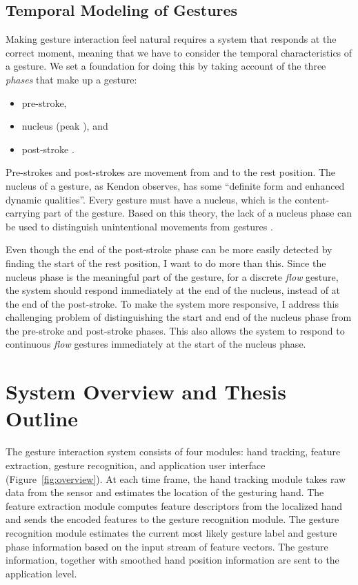 \subsection{Temporal Modeling of Gestures}\label{sec:temporal-model}
Making gesture interaction feel natural requires a system that responds at the
correct moment, meaning that we have to consider the temporal
characteristics of a gesture. We set a foundation for doing this by taking
account of the three \textit{phases} that make up a gesture:
\begin{itemize}
  \item pre-stroke,
  \item nucleus (peak \cite{mcneill82}), and
  \item post-stroke \cite{Pavlovic97}.
\end{itemize}
Pre-strokes and post-strokes are movement from and to the
rest position. The nucleus of a gesture,
as Kendon \cite{kendon86} observes, has some ``definite form and enhanced dynamic
qualities''. Every gesture must have a nucleus, which is the content-carrying
part of the gesture. Based on this theory, the lack of a nucleus phase can
be used to distinguish unintentional movements from gestures .

Even though the end of the
post-stroke phase can be more easily detected by finding the start of the
rest position, I want to do more than this. Since the nucleus phase is the
meaningful part of the gesture, for a discrete \textit{flow} gesture, the
system should respond immediately at the end of the nucleus, instead of at the
end of the post-stroke. To make the system more responsive, I address this challenging problem of distinguishing the start and end of the
 nucleus phase from the pre-stroke and post-stroke phases. This also allows the system to respond to continuous
\textit{flow} gestures immediately at the start of the nucleus phase.

\section{System Overview and Thesis Outline}
The gesture interaction system consists of four modules: hand tracking, 
feature extraction, gesture recognition, and application user interface
(Figure~\ref{fig:overview}). At each time frame, the
hand tracking module takes raw data from the sensor and estimates the location
of the gesturing hand. The feature extraction module computes feature
descriptors from the localized hand and sends the encoded features to the
gesture recognition module.
The gesture recognition module estimates the current most likely gesture label
and gesture phase information based on the input stream of feature vectors. The gesture information, 
together with smoothed hand position information are sent to the application
level. 

